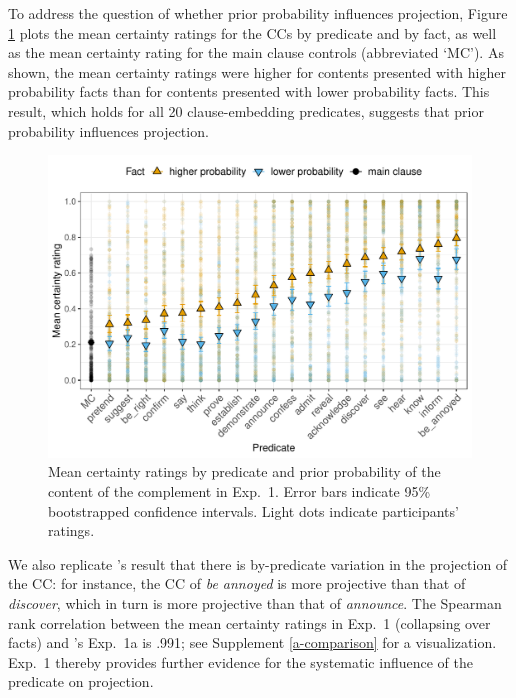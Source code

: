 \documentclass[11pt,fleqn]{article}
\newcommand{\6}{\mbox{$[\hspace*{-.6mm}[$}}
\newcommand{\9}{\mbox{$]\hspace*{-.6mm}]$}}
\newcommand{\citepos}[1]{\citeauthor{#1}'s \citeyear{#1}}
\begin{document}
To address the question of whether prior probability influences projection, Figure \ref{f-projection-mean} plots the mean certainty ratings for the CCs by  predicate and by fact, as well as the mean certainty rating for the main clause controls (abbreviated `MC'). As shown, the mean certainty ratings were higher for contents  presented with higher probability facts than for contents presented with lower probability facts. This result, which holds for all 20 clause-embedding predicates, suggests that prior probability influences projection.

\begin{figure}[h!]
\centering

\includegraphics[width=.7\paperwidth]{../../results/9-prior-projection/graphs/means-projectivity-by-predicate-and-prior}

\caption{Mean certainty ratings by predicate and prior probability of the content of the complement in Exp.~1. Error bars indicate 95\% bootstrapped confidence intervals. Light dots indicate participants' ratings.} 
\label{f-projection-mean}
\end{figure}
We also replicate \citepos{tonhauser-degen-factive} result that there is by-predicate variation in the projection of the CC: for instance, the CC of {\em be annoyed} is more projective than that of {\em discover}, which in turn is more projective than that of {\em announce}. The Spearman rank correlation between the mean certainty ratings in Exp.~1 (collapsing over facts) and \citepos{tonhauser-degen-factive} Exp.~1a is .991; see Supplement \ref{a-comparison} for a visualization. Exp.~1 thereby provides further evidence for the systematic influence of the predicate on projection.
\end{document}
